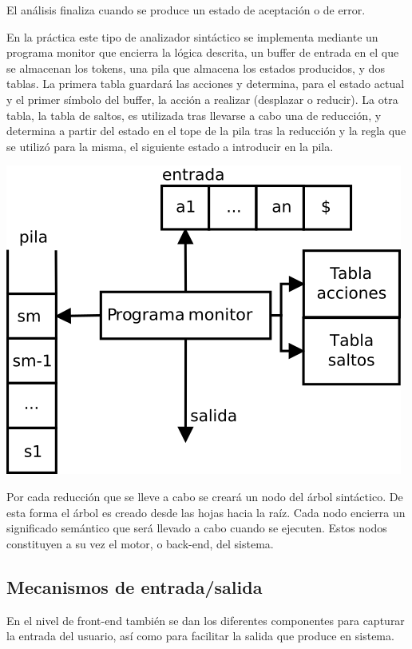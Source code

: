 El análisis finaliza cuando se produce un estado de aceptación o de error. 

En la práctica este tipo de analizador sintáctico se implementa mediante un programa monitor que encierra la lógica descrita, un buffer de entrada en el que se almacenan
los tokens, una pila que almacena los estados producidos, y dos tablas. La primera tabla guardará las acciones y determina, para el estado actual y el primer símbolo del buffer, 
la acción a realizar (desplazar o reducir). La otra tabla, la tabla de saltos, es utilizada tras llevarse a cabo una de reducción, y determina a partir del estado en el tope de la pila
tras la reducción y la regla que se utilizó para la misma, el siguiente estado a introducir en la pila. 

\begin{center}
\includegraphics[scale=0.7]{dia/asd.png} \\
\end{center}

Por cada reducción que se lleve a cabo se creará un nodo del árbol sintáctico. De esta forma el árbol es creado desde las hojas hacia la raíz. Cada nodo encierra un significado semántico que 
será llevado a cabo cuando se ejecuten. Estos nodos constituyen a su vez el motor, o back-end, del sistema.

\subsection{Mecanismos de entrada/salida}
En el nivel de front-end también se dan los diferentes componentes para capturar la entrada del usuario, así como para facilitar la salida que produce en sistema.

